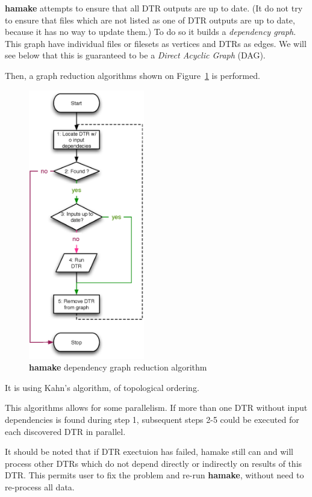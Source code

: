 \documentclass[11pt,twocolumn]{article}
\begin{document}
\textbf{hamake} attempts to ensure that all DTR outputs are up to
date. (It do not try to ensure that files which are not listed as one
of DTR outputs are up to date, because it has no way to update them.)
To do so it builds a \textit{dependency graph}. This graph have
individual files or filesets as vertices and DTRs as edges. We will
see below that this is guaranteed to be a \textit{Direct Acyclic
  Graph} (DAG).

Then, a graph reduction algorithms shown on Figure~\ref{fig:grred}
is performed.

\begin{figure}[htp]
\centering
\includegraphics[width=0.45\textwidth]{GraphReduction.eps}
\caption{\textbf{hamake} dependency graph reduction algorithm}
\label{fig:grred}
\end{figure}

It is using Kahn's algorithm\cite{kahn1962topological}, of topological
ordering\cite{wiki:topsort}.

This algorithms allows for some parallelism. If more than one DTR
without input dependencies is found during step 1, subsequent steps
2-5 could be executed for each discovered DTR in parallel.

It should be noted that if DTR exectuion has failed, hamake still can
and will process other DTRs which do not depend directly or indirectly
on results of this DTR. This permits user to fix the problem and
re-run \textbf{hamake}, without need to re-process all data.
\end{document}
